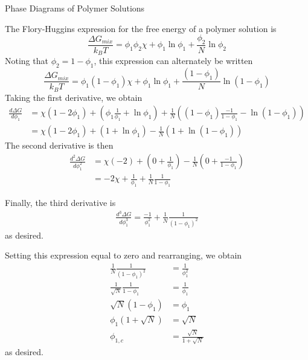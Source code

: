 \begin{activity}{Phase Diagrams of Polymer Solutions}
\begin{exercises}
\begin{enumerate}
				\begin{solution}{}
					The Flory-Huggins expression for the free energy of a polymer solution is 
					\begin{equation*}
						\frac{\Delta G_{mix}}{k_B T} = \phi_1\phi_2\chi + \phi_1\ln\phi_1 + \frac{\phi_2}{N}\ln\phi_2
					\end{equation*}
					Noting that $\phi_2 = 1-\phi_1$, this expression can alternately be written
					\begin{equation*}
						\frac{\Delta G_{mix}}{k_B T} = \phi_1(1-\phi_1)\chi + \phi_1\ln\phi_1 + \frac{(1-\phi_1)}{N}\ln(1-\phi_1)
					\end{equation*}
					Taking the first derivative, we obtain
					\begin{align*}
						\frac{ d\Delta G}{d\phi_1} &= \chi(1-2\phi_1) + \left(\phi_1\frac{1}{\phi_1} + \ln\phi_1\right) + \frac{1}{N}\left((1-\phi_1)\frac{-1}{1-\phi_1} - \ln(1-\phi_1)\right)\\
							&= \chi(1-2\phi_1) + (1 + \ln\phi_1) - \frac{1}{N}\left(1 + \ln(1-\phi_1)\right)
					\end{align*}
					The second derivative is then
					\begin{align*}
						\frac{d^2\Delta G}{d\phi_1^2} &= \chi(-2) + \left(0 + \frac{1}{\phi_1}\right)-\frac{1}{N}\left(0 + \frac{-1}{1-\phi_1}\right)\\
							&= -2\chi +\frac{1}{\phi_1} + \frac{1}{N}\frac{1}{1-\phi_1}
					\end{align*}
					\end{solution}  %
					\begin{solution}{}
					Finally, the third derivative is
					\begin{align*}
					\frac{d^3\Delta G}{d\phi_1^3} = \frac{-1}{\phi_1^2} + \frac{1}{N}\frac{1}{(1-\phi_1)^2}
					\end{align*}
					as desired.
					
					Setting this expression equal to zero and rearranging, we obtain
					\begin{align*}
						\frac{1}{N}\frac{1}{(1-\phi_1)^2} &= \frac{1}{\phi_1^2}\\
						\frac{1}{\sqrt{N}}\frac{1}{1-\phi_1} &= \frac{1}{\phi_1}\\
						\sqrt{N}(1-\phi_1) &= \phi_1\\
						\phi_1(1+\sqrt{N}) &= \sqrt{N}\\
						\phi_{1,c} &= \frac{\sqrt{N}}{1+\sqrt{N}}
					\end{align*}
					as desired.
				\end{solution}
				

\end{enumerate}
\end{exercises}
\end{activity}
